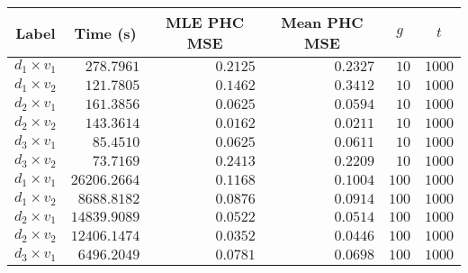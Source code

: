 \begin{tabular}{lrrrrr}
  \toprule
  \multicolumn{1}{c}{Label} & \multicolumn{1}{c}{Time (s)} & \multicolumn{1}{c}{MLE PHC MSE} & \multicolumn{1}{c}{Mean PHC MSE} & \multicolumn{1}{c}{$g$} & \multicolumn{1}{c}{$t$} \\
  \midrule
   $d_1 \times v_1$ &                   $278.7961$ &                        $0.2125$ &                         $0.2327$ &                    $10$ &                  $1000$ \\
   $d_1 \times v_2$ &                   $121.7805$ &                        $0.1462$ &                         $0.3412$ &                    $10$ &                  $1000$ \\
   $d_2 \times v_1$ &                   $161.3856$ &                        $0.0625$ &                         $0.0594$ &                    $10$ &                  $1000$ \\
   $d_2 \times v_2$ &                   $143.3614$ &                        $0.0162$ &                         $0.0211$ &                    $10$ &                  $1000$ \\
   $d_3 \times v_1$ &                    $85.4510$ &                        $0.0625$ &                         $0.0611$ &                    $10$ &                  $1000$ \\
   $d_3 \times v_2$ &                    $73.7169$ &                        $0.2413$ &                         $0.2209$ &                    $10$ &                  $1000$ \\
   \midrule
   $d_1 \times v_1$ &                 $26206.2664$ &                        $0.1168$ &                         $0.1004$ &                   $100$ &                  $1000$ \\
   $d_1 \times v_2$ &                  $8688.8182$ &                        $0.0876$ &                         $0.0914$ &                   $100$ &                  $1000$ \\
   $d_2 \times v_1$ &                 $14839.9089$ &                        $0.0522$ &                         $0.0514$ &                   $100$ &                  $1000$ \\
   $d_2 \times v_2$ &                 $12406.1474$ &                        $0.0352$ &                         $0.0446$ &                   $100$ &                  $1000$ \\
   $d_3 \times v_1$ &                  $6496.2049$ &                        $0.0781$ &                         $0.0698$ &                   $100$ &                  $1000$ \\

\end{tabular}
